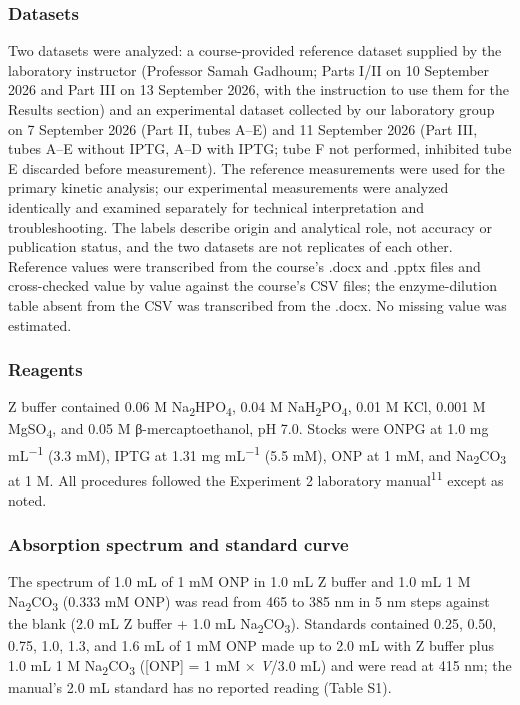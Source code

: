 \documentclass[9pt,twocolumn]{extarticle}
\newcommand{\cit}[1]{\textsuperscript{#1}}
\newcommand{\dash}{–}
\begin{document}
\subsubsection{Datasets}
Two datasets were analyzed: a course-provided reference dataset supplied by the laboratory instructor (Professor Samah Gadhoum; Parts I/II on 10 September 2026 and Part III on 13 September 2026, with the instruction to use them for the Results section) and an experimental dataset collected by our laboratory group on 7 September 2026 (Part II, tubes A\dash E) and 11 September 2026 (Part III, tubes A\dash E without IPTG, A\dash D with IPTG; tube F not performed, inhibited tube E discarded before measurement). The reference measurements were used for the primary kinetic analysis; our experimental measurements were analyzed identically and examined separately for technical interpretation and troubleshooting. The labels describe origin and analytical role, not accuracy or publication status, and the two datasets are not replicates of each other. Reference values were transcribed from the course's .docx and .pptx files and cross-checked value by value against the course's CSV files; the enzyme-dilution table absent from the CSV was transcribed from the .docx. No missing value was estimated.
\subsubsection{Reagents}
Z buffer contained 0.06 M Na\textsubscript{2}HPO\textsubscript{4}, 0.04 M NaH\textsubscript{2}PO\textsubscript{4}, 0.01 M KCl, 0.001 M MgSO\textsubscript{4}, and 0.05 M β-mercaptoethanol, pH 7.0. Stocks were ONPG at 1.0 mg mL\textsuperscript{−1} (3.3 mM), IPTG at 1.31 mg mL\textsuperscript{−1} (5.5 mM), ONP at 1 mM, and Na\textsubscript{2}CO\textsubscript{3} at 1 M. All procedures followed the Experiment 2 laboratory manual\cit{11} except as noted.
\subsubsection{Absorption spectrum and standard curve}
The spectrum of 1.0 mL of 1 mM ONP in 1.0 mL Z buffer and 1.0 mL 1 M Na\textsubscript{2}CO\textsubscript{3} (0.333 mM ONP) was read from 465 to 385 nm in 5 nm steps against the blank (2.0 mL Z buffer + 1.0 mL Na\textsubscript{2}CO\textsubscript{3}). Standards contained 0.25, 0.50, 0.75, 1.0, 1.3, and 1.6 mL of 1 mM ONP made up to 2.0 mL with Z buffer plus 1.0 mL 1 M Na\textsubscript{2}CO\textsubscript{3} ([ONP] = 1 mM × \textit{V}/3.0 mL) and were read at 415 nm; the manual's 2.0 mL standard has no reported reading (Table S1).
\end{document}

